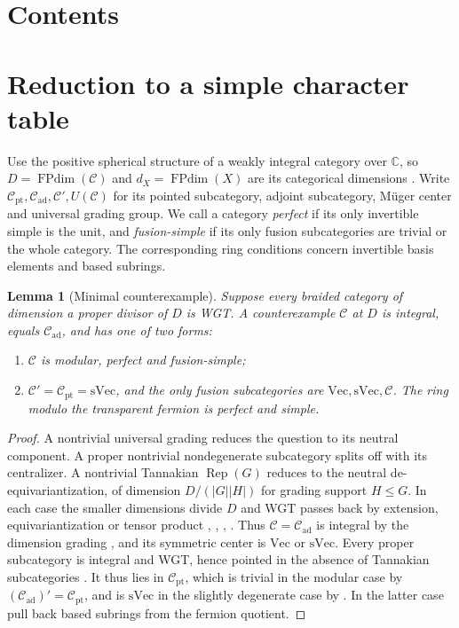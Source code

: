 \documentclass[11pt,a4paper]{article}
\makeatletter
\numberwithin{equation}{section}
\newtheorem{lemma}[theorem]{Lemma}
\theoremstyle{remark}
\newcommand{\C}{\mathcal C}
\renewcommand{\Vec}{\mathrm{Vec}}
\newcommand{\Rep}{\operatorname{Rep}}
\newcommand{\FPdim}{\operatorname{FPdim}}
\newcommand{\ad}{\mathrm{ad}}
\newcommand{\pt}{\mathrm{pt}}
\newcommand{\CC}{\mathbb C}
\newcommand{\sVec}{\mathrm{sVec}}
\newcommand{\papercontents}{\clearpage\begingroup\normalsize
  \parskip=1.5pt\relax
  \pdfbookmark[1]{Contents}{wholecontents}\section*{Contents}
  \def\@pnumwidth{2.0em}\def\@tocrmarg{2.8em}
  \def\l@section{\@dottedtocline{1}{0pt}{2.2em}}
  \@starttoc{toc}\endgroup\clearpage}
\makeatother
\begin{document}
\papercontents

\section{Reduction to a simple character table}\label{fam:M:sec:2}\label{sec:wgt-preliminaries}
Use the positive spherical structure of a weakly integral category over $\CC$, so $D=\FPdim(\C)$ and $d_X=\FPdim(X)$ are its categorical dimensions \cite[Propositions~8.23 and~8.24]{ENOannals}. Write $\C_{\pt},\C_{\ad},\C',U(\C)$ for its pointed subcategory, adjoint subcategory, M\"uger center and universal grading group. We call a category \emph{perfect} if its only invertible simple is the unit, and \emph{fusion-simple} if its only fusion subcategories are trivial or the whole category. The corresponding ring conditions concern invertible basis elements and based subrings.

\begin{lemma}[Minimal counterexample]\label{fam:M:2.1}\label{lem:minimal}\label{lem:proper-divisor-reduction}\label{lem:minimal-counterexample-simple}
Suppose every braided category of dimension a proper divisor of $D$ is WGT. A counterexample $\C$ at $D$ is integral, equals $\C_{\ad}$, and has one of two forms:
\begin{enumerate}[label=\textup{(\roman*)},leftmargin=*]
\item $\C$ is modular, perfect and fusion-simple;
\item $\C'=\C_{\pt}=\sVec$, and the only fusion subcategories are $\Vec,\sVec,\C$. The ring modulo the transparent fermion is perfect and simple.
\end{enumerate}
\end{lemma}
\begin{proof}
A nontrivial universal grading reduces the question to its neutral component. A proper nontrivial nondegenerate subcategory splits off with its centralizer. A nontrivial Tannakian $\Rep(G)$ reduces to the neutral de-equivariantization, of dimension $D/(|G||H|)$ for grading support $H\le G$. In each case the smaller dimensions divide $D$ and WGT passes back by extension, equivariantization or tensor product \cite[Propositions~8.15 and~8.20]{ENOannals}, \cite[Proposition~4.1]{ENOsolvable}, \cite[Theorems~3.13(i) and~4.44, Proposition~4.26]{DGNO}, \cite[Proposition~4.1]{NataleWGT}. Thus $\C=\C_{\ad}$ is integral by the dimension grading \cite[Theorem~3.10]{GNnil}, and its symmetric center is $\Vec$ or $\sVec$. Every proper subcategory is integral and WGT, hence pointed in the absence of Tannakian subcategories \cite[Theorem~3.1]{NataleCore}. It thus lies in $\C_{\pt}$, which is trivial in the modular case by $(\C_{\ad})'=\C_{\pt}$, and is $\sVec$ in the slightly degenerate case by \cite[Lemma~7.1]{NataleWGT}. In the latter case pull back based subrings from the fermion quotient.
\end{proof}
\end{document}
